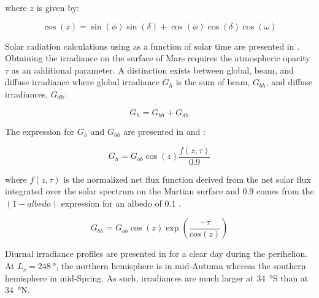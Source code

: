 where $z$ is given by:

\begin{equation}
  \label{eq:cosz}
  \cos{(z)} = \sin{(\phi)}\sin{(\delta)} + \cos{(\phi)}\cos{(\delta)}\cos{(\omega)}
\end{equation}

Solar radiation calculations using  as a function of solar time are presented in . Obtaining the irradiance on the surface of Mars requires the atmospheric opacity $\tau$ as an additional parameter. A distinction exists between global, beam, and diffuse irradiance where global irradiance $G_{h}$ is the sum of beam, $G_{bh}$, and diffuse irradiances, $G_{dh}$:



\begin{equation}
  \label{eq:G_h_1}
  G_{h} = G_{bh} + G_{dh}
\end{equation}

The expression for $G_{h}$ and $G_{bh}$ are presented in  and :

\begin{equation}
  \label{eq:G_h_2}
  G_{h} = G_{ob}\cos{(z)}\frac{f(z,\tau)}{0.9}
\end{equation}

where $f(z,\tau)$ is the normalized net flux function derived from the net solar flux integrated over the solar spectrum on the Martian surface and 0.9 comes from the $(1-albedo)$ expression for an albedo of 0.1 .

\begin{equation}
  \label{eq:G_bh}
  G_{bh} = G_{ob}\cos{(z)}\exp\left(\frac{-\tau}{cos{(z)}}\right)
\end{equation}

\vspace{0.5cm}

Diurnal irradiance profiles are presented in  for a clear day during the perihelion. At $L_{s} = \SI{248}{\degree}$, the northern hemisphere is in mid-Autumn whereas the southern hemisphere in mid-Spring. As such, irradiances are much larger at \SI{34}{\degree}S than at \SI{34}{\degree}N.

